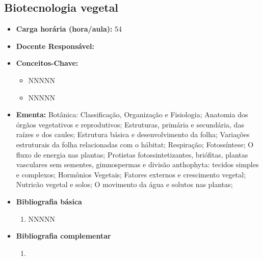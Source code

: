 \documentclass[11pt,fleqn]{book} %
\begin{document}
\subsection{Biotecnologia vegetal}\label{disc:biotecVegetal}
\begin{itemize}
	\item \textbf{Carga horária (hora/aula):} 54
	\item \textbf{Docente Responsável:}
	\item \textbf{Conceitos-Chave:}
	\begin{itemize}
		\item NNNNN
		\item NNNNN
	\end{itemize}
	\item \textbf{Ementa:} 
	Botânica: Classificação, Organização e Fisiologia; 
	Anatomia dos órgãos vegetativos e reprodutivos;
	Estruturas, primária e secundária, das raízes e dos caules; 
	Estrutura básica e desenvolvimento da folha; 
	Variações estruturais da folha relacionadas com o hábitat;
	Respiração; 
	Fotossíntese;
	O fluxo de energia nas plantas; 
	Protistas fotossintetizantes, briófitas, plantas vasculares sem sementes, gimnospermas e divisão anthophyta: tecidos simples e complexos; 
	Hormônios Vegetais; 
	Fatores externos e crescimento vegetal; 
	Nutricão vegetal e solos; 
	O movimento da água e solutos nas plantas; 
	\item \textbf{Bibliografia básica}
	\begin{enumerate}
		\item NNNNN
	\end{enumerate}
	\item \textbf{Bibliografia complementar}
	\begin{enumerate}
		\item 
	\end{enumerate}	
\end{itemize}


\newpage
\end{document}
